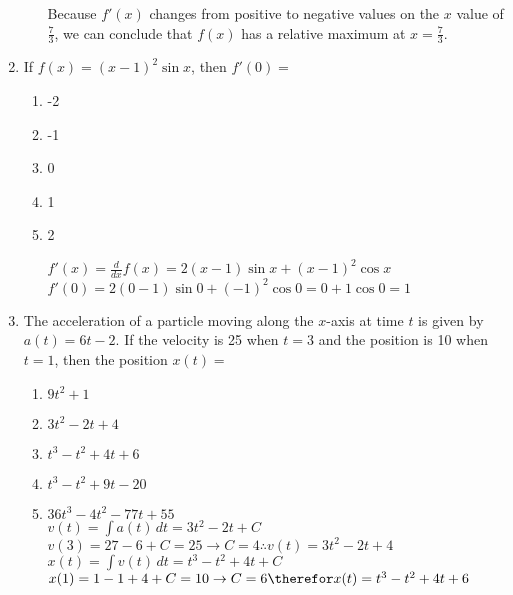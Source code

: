 \documentclass[10pt, letterpaper]{report}
\begin{document}
\begin{enumerate}
\begin{enumerate}
      Because $f'(x)$ changes from positive to negative values on the $x$ value of $\frac{7}{3}$, we can conclude that $f(x)$ has a relative maximum at $x=\frac{7}{3}$. \\
    \end{enumerate}
    \hline
    \item{If $f(x)=(x-1)^{2}\sin{x}$, then $f'(0)=$}
    \begin{enumerate}
      \item{-2}
      \item{-1}
      \item{0}
      \item{1}
      \item{2}

      $f'(x)=\frac{d}{dx}f(x)=2(x-1)\sin{x}+(x-1)^{2}\cos{x}$ \\

      $f'(0)=2(0-1)\sin{0}+(-1)^{2}\cos{0}=0+1\cos{0}=1$ \\
    \end{enumerate}
    \hline
    \item{The acceleration of a particle moving along the $x$-axis at time $t$ is given by $a(t)=6t-2$. If the velocity is 25 when $t=3$ and the position is 10 when $t=1$, then the position $x(t)=$}
    \begin{enumerate}
      \item{$9t^{2}+1$}
      \item{$3t^{2}-2t+4$}
      \item{$t^{3}-t^{2}+4t+6$}
      \item{$t^{3}-t^{2}+9t-20$}
      \item{$36t^{3}-4t^{2}-77t+55$} \\

      $v(t)=\int{a(t)}\,dt=3t^{2}-2t+C$ \\

      $v(3) = 27 - 6 + C = 25 \rightarrow C = 4\therefore v(t)=3t^{2}-2t+4$ \\

      $x(t)=\int{v(t)}\,dt=t^{3}-t^{2}+4t+C$ \\

      $x(1)=1-1+4+C=10\rightarrow C=6\therefor x(t)=t^{3}-t^{2}+4t+6$
    \end{enumerate}
\end{enumerate}
\end{document}
